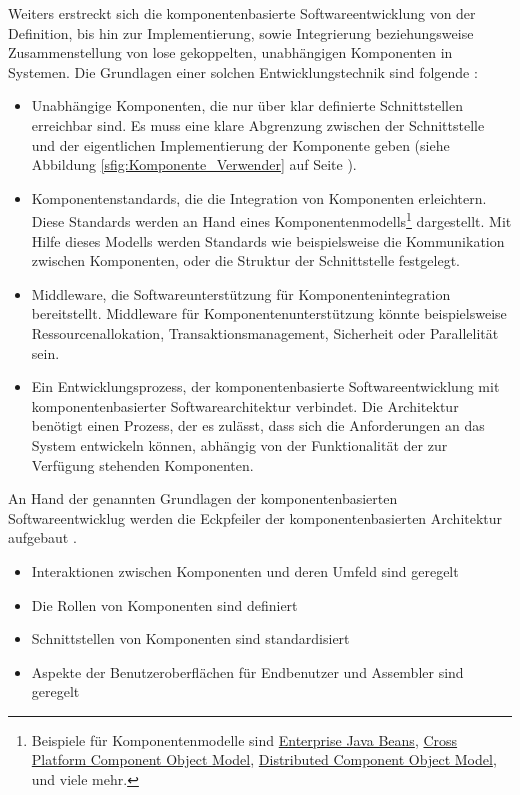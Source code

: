 Weiters erstreckt sich die komponentenbasierte Softwareentwicklung von der Definition, bis hin zur Implementierung, sowie Integrierung beziehungsweise Zusammenstellung von lose gekoppelten, unabhängigen Komponenten in Systemen. Die Grundlagen einer solchen Entwicklungstechnik sind folgende \citereset \autocite[siehe][S. 452-468]{Sommerville.2011}:
\begin{itemize}
\item Unabhängige Komponenten, die nur über klar definierte Schnittstellen erreichbar sind. Es muss eine klare Abgrenzung zwischen der Schnittstelle und der eigentlichen Implementierung der Komponente geben (siehe Abbildung \ref{sfig:Komponente_Verwender} auf Seite \pageref{sfig:Komponente_Verwender}).
\item Komponentenstandards, die die Integration von Komponenten erleichtern. Diese Standards werden an Hand eines Komponentenmodells\footnote{Beispiele für Komponentenmodelle sind \href{http://www.oracle.com/technetwork/java/javaee/ejb/index.html}{Enterprise Java Beans}, \href{https://developer.mozilla.org/de/docs/XPCOM}{Cross Platform Component Object Model}, \href{http://technet.microsoft.com/en-us/library/cc958799.aspx}{Distributed Component Object Model}, und viele mehr.} dargestellt. Mit Hilfe dieses Modells werden Standards wie beispielsweise die Kommunikation zwischen Komponenten, oder die Struktur der Schnittstelle festgelegt.
\item Middleware, die Softwareunterstützung für Komponentenintegration bereitstellt. Middleware für Komponentenunterstützung könnte beispielsweise Ressourcenallokation, Transaktionsmanagement, Sicherheit oder Parallelität sein.
\item Ein Entwicklungsprozess, der komponentenbasierte Softwareentwicklung mit komponentenbasierter Softwarearchitektur verbindet. Die Architektur benötigt einen Prozess, der es zulässt, dass sich die Anforderungen an das System entwickeln können, abhängig von der Funktionalität der zur Verfügung stehenden Komponenten.
\end{itemize}

An Hand der genannten Grundlagen der komponentenbasierten Softwareentwicklug werden die Eckpfeiler der komponentenbasierten Architektur aufgebaut \citereset \autocite[siehe][35-47]{Szyperski.2002}.
\begin{itemize}
\item Interaktionen zwischen Komponenten und deren Umfeld sind geregelt
\item Die Rollen von Komponenten sind definiert
\item Schnittstellen von Komponenten sind standardisiert
\item Aspekte der Benutzeroberflächen für Endbenutzer und Assembler sind geregelt
\end{itemize}

